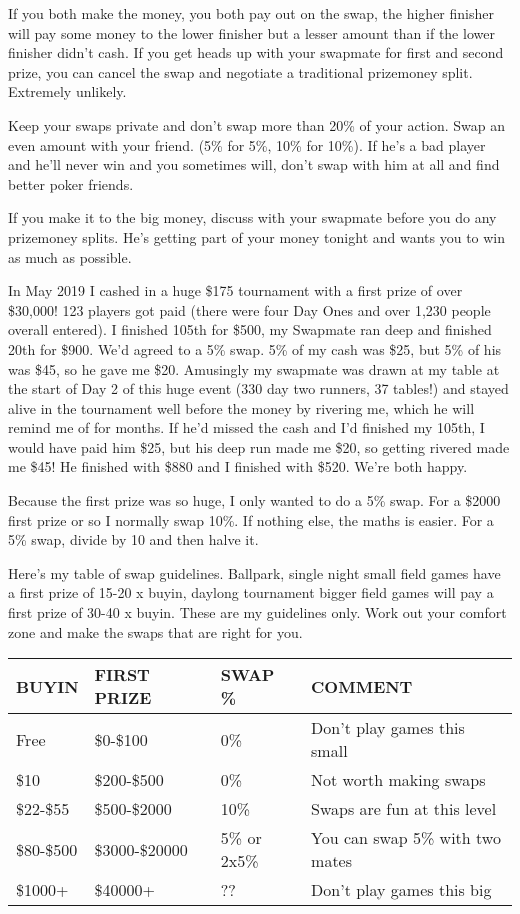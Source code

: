 If you both make the money, you both pay out on the swap, the
higher finisher will pay some money to the lower finisher but a lesser
amount than if the lower finisher didn't cash. If you get heads up
with your swapmate for first and second prize, you can cancel the swap
and negotiate a traditional prizemoney split. Extremely unlikely.

Keep your swaps private and don't swap more than 20\% of your action.
Swap an even amount with your friend. (5\% for 5\%, 10\% for 10\%).
If he's a bad player and he'll never win and you sometimes will, don't
swap with him at all and find better poker friends.

If you make it to the big money, discuss with your swapmate before you
do any prizemoney splits. He's getting part of your money tonight and
wants you to win as much as possible.

In May 2019 I cashed in a huge \$175 tournament with a first
prize of over \$30,000! 123 players got paid (there were four Day Ones
and over 1,230 people overall entered). I finished 105th for \$500, my
Swapmate ran deep and finished 20th for \$900. We'd agreed to a 5\% swap.
5\% of my cash was \$25, but 5\% of his was \$45, so he gave me \$20.
Amusingly my swapmate was drawn at my table at the start of Day 2 of
this huge event (330 day two runners, 37 tables!) and stayed alive in
the tournament well before the money by rivering me, which he will
remind me of for months. If he'd missed the cash and I'd finished my
105th, I would have paid him \$25, but his deep run made me \$20, so
getting rivered made me \$45! He finished with \$880 and I
finished with \$520. We're both happy.

Because the first prize was so huge, I only wanted to do a 5\% swap.
For a \$2000 first prize or so I normally swap 10\%. If nothing else,
the maths is easier. For a 5\% swap, divide by 10 and then halve it.

Here's my table of swap guidelines. Ballpark, single night small field
games have a first prize of 15-20 x buyin, daylong tournament bigger
field games will pay a first prize of 30-40 x buyin.
These are my guidelines only. Work out your comfort zone and make the
swaps that are right for you.

\begin{tabular}{|l|l|l|l|} \hline
BUYIN & FIRST PRIZE & SWAP \% & COMMENT\\ \hline
Free  & \$0-\$100 & 0\% & Don't play games this small \\ \hline
\$10  & \$200-\$500 & 0\%  & Not worth making swaps \\ \hline
\$22-\$55 & \$500-\$2000 & 10\% & Swaps are fun at this level \\ \hline
\$80-\$500 & \$3000-\$20000 & 5\% or 2x5\% & You can swap 5\% with two mates \\ \hline
\$1000+ & \$40000+ & ?? & Don't play games this big \\ \hline
\end{tabular}

